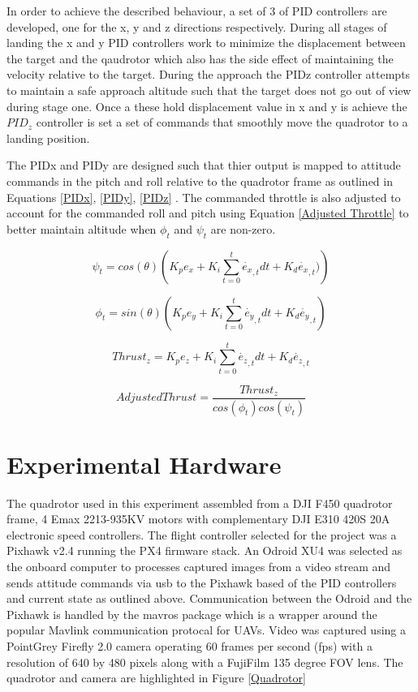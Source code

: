 \documentclass[11pt, twocolumn]{article}
\begin{document}
In order to achieve the described behaviour, a set of 3 of PID controllers are developed, one for the x, y and z directions respectively. During all stages of landing the x and y PID controllers work to minimize the displacement between the target and the qaudrotor which also has the side effect of maintaining the velocity relative to the target. During the approach the PIDz controller attempts to maintain a safe approach altitude such that the target does not go out of view during stage one. Once a these hold displacement value in x and y is achieve the $PID_z$ controller is set a set of commands that smoothly move the quadrotor to a landing position. 

The PIDx and PIDy are designed such that thier output is mapped to attitude commands in the pitch and roll relative to the quadrotor frame as outlined in Equations \ref{PIDx}, \ref{PIDy}, \ref{PIDz} . The commanded throttle is also adjusted to account for the commanded roll and pitch using Equation \ref{Adjusted Throttle} to better maintain altitude when $\phi_t$ and $\psi_t$ are non-zero. 

\begin{equation}
\label{PIDx}
	\psi_t = cos(\theta) \left( K_p e_x + K_i \sum_{t=0}^{t} \dot{e_x}_{,t} dt + K_d \dot{e_x}_{,t}) \right)
\end{equation}

\begin{equation}
\label{PIDy}
	\phi_t = sin(\theta) \left( K_p e_y + K_i \sum_{t=0}^{t} \dot{e_y}_{,t} dt + K_d \dot{e_y}_{,t} \right)
\end{equation}

\begin{equation}
\label{PIDz}
	Thrust_z = K_p e_z + K_i \sum_{t=0}^{t} \dot{e_z}_{,t} dt + K_d \dot{e_z}_{,t} 
\end{equation}

\begin{equation}
\label{Adjusted Throttle}
	AdjustedThrust = \frac{Thrust_z}{cos(\phi_t) cos(\psi_t)}
\end{equation}


\section{Experimental Hardware}
The quadrotor used in this experiment assembled from a DJI F450 quadrotor frame, 4 Emax 2213-935KV motors with complementary DJI E310 420S 20A electronic speed controllers. The flight controller selected for the project was a Pixhawk v2.4 running the PX4 firmware stack. An Odroid XU4 was selected as the onboard computer to processes captured images from a video stream and sends attitude commands via usb to the Pixhawk based of the PID controllers and current state as outlined above. Communication between the Odroid and the Pixhawk is handled by the mavros package which is a wrapper around the popular Mavlink communication protocal for UAVs.  Video was captured using a PointGrey Firefly 2.0 camera operating 60 frames per second (fps) with a resolution of 640 by 480 pixels along with a FujiFilm 135 degree FOV lens. The quadrotor and camera are highlighted in Figure \ref{Quadrotor}
\end{document}
